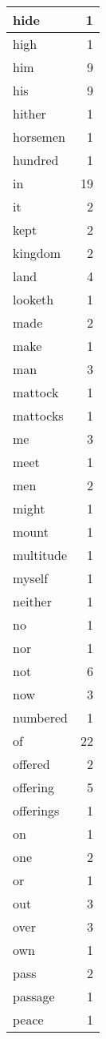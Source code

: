 \begin{center}
\begin{longtable}{l|r}
hide & 1 \\ \hline
high & 1 \\ \hline
him & 9 \\ \hline
his & 9 \\ \hline
hither & 1 \\ \hline
horsemen & 1 \\ \hline
hundred & 1 \\ \hline
in & 19 \\ \hline
it & 2 \\ \hline
kept & 2 \\ \hline
kingdom & 2 \\ \hline
land & 4 \\ \hline
looketh & 1 \\ \hline
made & 2 \\ \hline
make & 1 \\ \hline
man & 3 \\ \hline
mattock & 1 \\ \hline
mattocks & 1 \\ \hline
me & 3 \\ \hline
meet & 1 \\ \hline
men & 2 \\ \hline
might & 1 \\ \hline
mount & 1 \\ \hline
multitude & 1 \\ \hline
myself & 1 \\ \hline
neither & 1 \\ \hline
no & 1 \\ \hline
nor & 1 \\ \hline
not & 6 \\ \hline
now & 3 \\ \hline
numbered & 1 \\ \hline
of & 22 \\ \hline
offered & 2 \\ \hline
offering & 5 \\ \hline
offerings & 1 \\ \hline
on & 1 \\ \hline
one & 2 \\ \hline
or & 1 \\ \hline
out & 3 \\ \hline
over & 3 \\ \hline
own & 1 \\ \hline
pass & 2 \\ \hline
passage & 1 \\ \hline
peace & 1 \\ \hline

\end{longtable}
\end{center}
